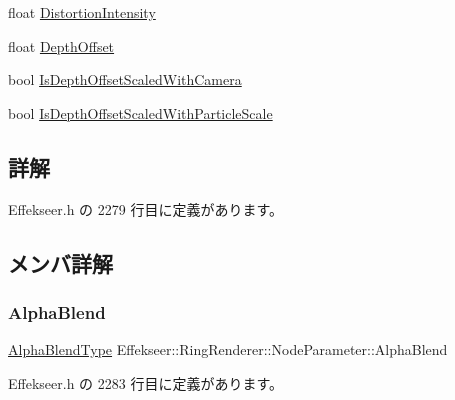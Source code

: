 \begin{DoxyCompactItemize}
float \mbox{\hyperlink{struct_effekseer_1_1_ring_renderer_1_1_node_parameter_a533b7d84f37defe0accbcfaeb2a4ed50}{Distortion\+Intensity}}
\item 
float \mbox{\hyperlink{struct_effekseer_1_1_ring_renderer_1_1_node_parameter_a653a2891300dca269562fc68e55eb2e4}{Depth\+Offset}}
\item 
bool \mbox{\hyperlink{struct_effekseer_1_1_ring_renderer_1_1_node_parameter_a2c32d13c1ffbe118b59348986daba290}{Is\+Depth\+Offset\+Scaled\+With\+Camera}}
\item 
bool \mbox{\hyperlink{struct_effekseer_1_1_ring_renderer_1_1_node_parameter_ae917bd956f2a24b7b387b80edf047604}{Is\+Depth\+Offset\+Scaled\+With\+Particle\+Scale}}
\end{DoxyCompactItemize}


\subsection{詳解}


 Effekseer.\+h の 2279 行目に定義があります。



\subsection{メンバ詳解}
\mbox{\label{struct_effekseer_1_1_ring_renderer_1_1_node_parameter_a73f862f36c32e13c7e3109be755acad3}} 
\subsubsection{\texorpdfstring{Alpha\+Blend}{AlphaBlend}}
{\footnotesize\ttfamily \mbox{\hyperlink{namespace_effekseer_a8c32fd5b7ec7feed73314b2ae8086949}{Alpha\+Blend\+Type}} Effekseer\+::\+Ring\+Renderer\+::\+Node\+Parameter\+::\+Alpha\+Blend}



 Effekseer.\+h の 2283 行目に定義があります。

\mbox{\label{struct_effekseer_1_1_ring_renderer_1_1_node_parameter_a834a9662e348bf4b79779586628530a5}} 
